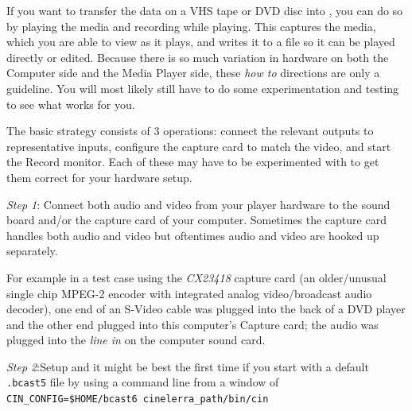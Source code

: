 If you want to transfer the data on a VHS tape or DVD disc into \CGG{}, you can do so by playing the media and recording while playing.  This captures the media, which you are able to view as it plays, and writes it to a file so it can be played directly or edited.  Because there is so much variation in hardware on both the Computer side and the Media Player side, these \textit{how to} directions are only a guideline.  You will most likely still have to do some experimentation and testing to see what works for you.

The basic strategy consists of 3 operations:  connect the relevant outputs to representative inputs, configure the capture card to match the video, and start the Record monitor.  Each of these may have to be experimented with to get them correct for your hardware setup.

\textit{Step 1}: Connect both audio and video from your player hardware to the sound board and/or the capture card of your computer.  Sometimes the capture card handles both audio and video but oftentimes audio and video are hooked up separately.

For example in a test case using the \textit{CX23418} capture card (an older/unusual single chip MPEG-2 encoder with integrated analog video/broadcast audio decoder), one end of an S-Video cable was plugged into the back of a DVD player and the other end plugged into this computer’s Capture card; the audio was plugged into the \textit{line in} on the computer sound card.

\textit{Step 2}:Setup \CGG{} and it might be best the first time if you start with a default \texttt{.bcast5} file by using a
command line from a window of \\
\texttt{CIN\_CONFIG=\$HOME/bcast6 {cinelerra\_path}/bin/cin}

